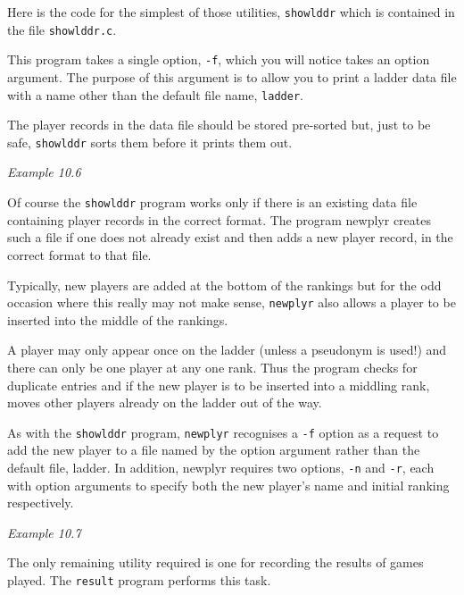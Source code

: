   Here is the code for the simplest of those utilities,
   \texttt{showlddr} which is contained in the file
   \texttt{showlddr.c}.


  This program takes a single option, \texttt{-f}, which you will notice
   takes an option argument. The purpose of this argument is to allow you to
   print a ladder data file with a name other than the default file name,
   \texttt{ladder}.


  The player records in the data file should be stored pre-sorted but, just
   to be safe, \texttt{showlddr} sorts them before it prints them out.


  \begin{center}\textit{Example 10.6}\end{center}


  Of course the \texttt{showlddr} program works only if there is an
   existing data file containing player records in the correct format. The
   program newplyr creates such a file if one does not already exist and then
   adds a new player record, in the correct format to that file.


  Typically, new players are added at the bottom of the rankings but for the
   odd occasion where this really may not make sense, \texttt{newplyr} also
   allows a player to be inserted into the middle of the rankings.


  A player may only appear once on the ladder (unless a pseudonym is used!)
   and there can only be one player at any one rank. Thus the program checks
   for duplicate entries and if the new player is to be inserted into
   a middling rank, moves other players already on the ladder out of the
   way.


  As with the \texttt{showlddr} program, \texttt{newplyr} recognises
   a \texttt{-f} option as a request to add the new player to a file named
   by the option argument rather than the default file, ladder. In addition,
   newplyr requires two options, \texttt{-n} and \texttt{-r}, each with
   option arguments to specify both the new player's name and initial ranking
   respectively.


  \begin{center}\textit{Example 10.7}\end{center}


  The only remaining utility required is one for recording the results of
   games played. The \texttt{result} program performs this task.


